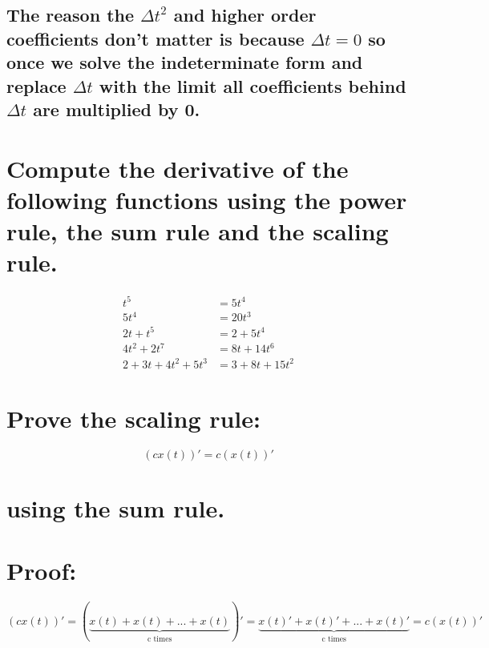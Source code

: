 \documentclass{article}
\begin{document}
\subsection*{The reason the ${\Delta t}^2$ and higher order coefficients don't matter is because $\Delta t = 0$ so once we solve the indeterminate form and replace $\Delta t$ with the limit all coefficients behind $\Delta t$ are multiplied by 0.}

\section{\normalfont Compute the derivative of the following functions using the power rule, the sum rule and the scaling rule.}

\begin{equation}
\begin{split}
t^5 & = 5t^4 \\
5t^4 & = 20t^3 \\
2t + t^5 & = 2 + 5t^4 \\
4t^2 + 2t^7 & = 8t + 14t^6 \\
2 + 3t + 4t^2 + 5t^3 & = 3 + 8t + 15t^2 
\end{split}
\end{equation}

\section{\normalfont Prove the scaling rule:}

\begin{equation}
(cx(t))' = c(x(t))'    
\end{equation}

\section*{\normalfont using the sum rule.}

\section*{Proof:}

\begin{equation}
(cx(t))' = (\underbrace{x(t) + x(t) + ... + x(t)}_{\text{c times}})' = \underbrace{x(t)' + x(t)' + ... + x(t)'}_{\text{c times}} = c(x(t))'
\end{equation}
\end{document}
